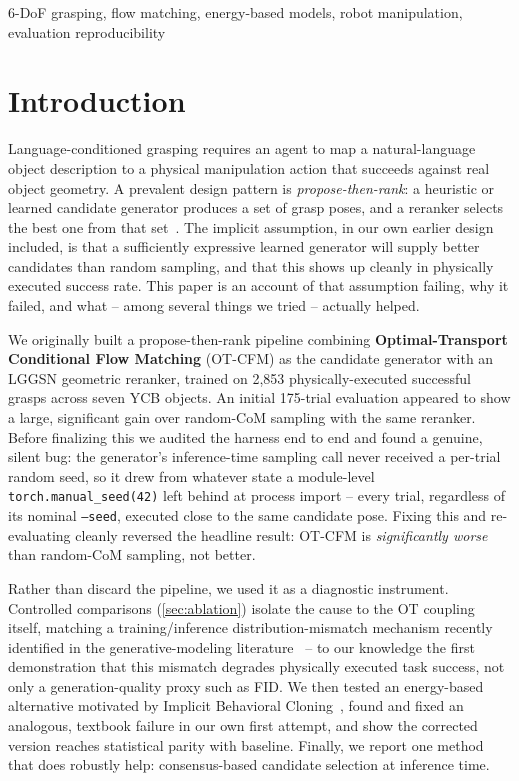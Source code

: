 \documentclass[journal]{IEEEtran}
\begin{document}
\begin{IEEEkeywords}
6-DoF grasping, flow matching, energy-based models, robot manipulation,
evaluation reproducibility
\end{IEEEkeywords}

\section{Introduction}
\label{sec:intro}

Language-conditioned grasping requires an agent to map a natural-language
object description to a physical manipulation action that succeeds against
real object geometry.
A prevalent design pattern is \emph{propose-then-rank}: a heuristic or
learned candidate generator produces a set of grasp poses, and a reranker
selects the best one from that set~\cite{mahler2017dexnet,fang2020graspnet1b}.
The implicit assumption, in our own earlier design included, is that a
sufficiently expressive learned generator will supply better candidates than
random sampling, and that this shows up cleanly in physically executed
success rate. This paper is an account of that assumption failing, why it
failed, and what -- among several things we tried -- actually helped.

We originally built a propose-then-rank pipeline combining
\textbf{Optimal-Transport Conditional Flow Matching} (OT-CFM)
\cite{lipman2022cfm,tong2023otcfm} as the candidate generator with an LGGSN
geometric reranker, trained on 2{,}853 physically-executed successful grasps
across seven YCB objects. An initial 175-trial evaluation appeared to show a
large, significant gain over random-CoM sampling with the same reranker.
Before finalizing this we audited the harness end to end and found a
genuine, silent bug: the generator's inference-time sampling call never
received a per-trial random seed, so it drew from whatever state a
module-level \texttt{torch.manual\_seed(42)} left behind at process import
-- every trial, regardless of its nominal \texttt{--seed}, executed close to
the same candidate pose. Fixing this and re-evaluating cleanly reversed the
headline result: OT-CFM is \emph{significantly worse} than random-CoM
sampling, not better.

Rather than discard the pipeline, we used it as a diagnostic instrument.
Controlled comparisons (\cref{sec:ablation}) isolate the cause to the OT
coupling itself, matching a training/inference distribution-mismatch
mechanism recently identified in the generative-modeling
literature~\cite{cheng2025curse} -- to our knowledge the first demonstration
that this mismatch degrades physically executed task success, not only a
generation-quality proxy such as FID. We then tested an energy-based
alternative motivated by Implicit Behavioral
Cloning~\cite{florence2021implicit}, found and fixed an analogous, textbook
failure in our own first attempt, and show the corrected version reaches
statistical parity with baseline. Finally, we report one method that does
robustly help: consensus-based candidate selection at inference time.
\end{document}
